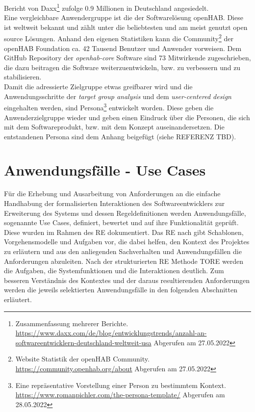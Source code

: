         Bericht von Daxx\footnote{Zusammenfassung mehrerer Berichte. \url{https://www.daxx.com/de/blog/entwicklungstrends/anzahl-an-softwareentwicklern-deutschland-weltweit-usa} Abgerufen am 27.05.2022}
        zufolge 0.9 Millionen in Deutschland angesiedelt. 
        \\
        \linebreak
        Eine vergleichbare Anwendergruppe ist die der Softwarelösung openHAB. Diese ist weltweit bekannt und zählt unter die 
        beliebtesten und am meist genutzt open source Lösungen. Anhand den eigenen Statistiken kann die Community\footnote{Website Statistik der openHAB Community. \url{https://community.openhab.org/about} Abgerufen am 27.05.2022} 
        der openHAB Foundation ca. 42 Tausend Benutzer und Anwender vorweisen. Dem GitHub Repository der \textit{openhab-core} 
        Software sind 73 Mitwirkende zugeschrieben, die dazu beitragen die Software weiterzuentwickeln, bzw. zu verbessern und zu 
        stabilisieren.
    \\
    \linebreak 
    Damit die adressierte Zielgruppe etwas greifbarer wird und die Anwendungsschritte der \textit{target group analysis} und 
    dem \textit{user-centered design} eingehalten werden, sind Persona\footnote{Eine repräsentative Vorstellung einer Person zu bestimmtem Kontext. \url{https://www.romanpichler.com/the-persona-template/} Abgerufen am 28.05.2022} 
    entwickelt worden. Diese geben die Anwenderzielgruppe wieder und geben einen Eindruck über die Personen, die sich mit dem 
    Softwareprodukt, bzw. mit dem Konzept auseinandersetzen. Die entstandenen Persona sind dem Anhang beigefügt 
    (siehe REFERENZ TBD). %

\section{Anwendungsfälle - Use Cases}
\label{sec:usecases}
    Für die Erhebung und Ausarbeitung von Anforderungen an die einfache Handhabung der formalisierten 
    Interaktionen des Softwareentwicklers zur Erweiterung des Systems und dessen Regeldefinitionen werden Anwendungsfälle, 
    sogenannte Use Cases, definiert, bewertet und auf ihre Funktionalität geprüft. Diese wurden im Rahmen 
    des \acl{RE} dokumentiert. Das \acs{RE} nach \cite{pohl2021basiswissen} gibt Schablonen, Vorgehensmodelle und Aufgaben 
    vor, die dabei helfen, den Kontext des Projektes zu erläutern und aus den anliegenden Sachverhalten und Anwendungsfällen 
    die Anforderungen abzuleiten. Nach der strukturierten \acs{RE} Methode \ac{TORE} \cite{tore2014} werden die 
    Aufgaben, die Systemfunktionen und die Interaktionen deutlich. Zum besseren Verständnis des Kontextes und der daraus 
    resultierenden Anforderungen werden die jeweils selektierten Anwendungsfälle in den folgenden Abschnitten 
    erläutert.
    \\
    \linebreak
